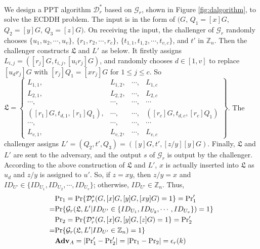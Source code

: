 We design a PPT algorithm $\mathcal{D}^*_r$ based on $\mathcal{G}_r$, shown in Figure \ref{fig:dalgorithm}, to solve the ECDDH problem.
The input is in the form of $(G$, $Q_1=[x]G$, $Q_2=[y]G$, $Q_3=[z]G)$.
On receiving the input, the challenger of $\mathcal{G}_r$ randomly chooses
 $\{u_1, u_2, \cdots, u_v\}$, $\{r_1, r_2, \cdots, r_c\}$, $\{t_{1, 1}, t_{1, 2}, \cdots, t_{v, c}\}$, and $t'$ in $\mathbb{Z}_n$.
Then the challenger constructs $\mathfrak{L}$ and $L'$ as below.
It firstly assigns $L_{i, j} = ([r_j]G, t_{i, j}, [u_ir_j]G)$, %
    and randomly chooses $d \in [1, v]$ to
 replace $[u_d r_j]G$ with $[r_j]Q_1=[xr_j]G$ for $1\leq j \leq c$.
So $\mathfrak{L}=\left \{ \begin{matrix}
L_{1,1},&L_{1,2},&\cdots,&L_{1,c}\\
L_{2,1},& L_{2,2},&\cdots,&L_{2,c}\\
\cdots,&\cdots,&\cdots,&\cdots\\
([r_{1}]G, t_{d, 1}, [r_{1}]Q_1),&\cdots,&\cdots,&([r_{c}]G, t_{d, c}, [r_{c}]Q_1)\\
\cdots,&\cdots,&\cdots,&\cdots\\
L_{v,1},&L_{v,2},&\cdots,&L_{v,c}
\end{matrix}\right\}$.
%
The challenger assigns $L' = (Q_2, t', Q_3) = ([y]G, t', [z/y][y]G)$.
Finally,
    $\mathfrak{L}$ and $L'$ are sent to the adversary,
        and the output $s$ of $\mathcal{G}_r$ is output by the challenger.
According to the above construction of $\mathfrak{L}$ and $L'$,
    $x$ is actually inserted into $\mathfrak{L}$ as $u_d$
    and $z/y$ is assigned to $u'$.
So, if $z = xy$, then $z/y=x$ and $ID_{U'} \in \{ID_{U_1}, ID_{U_2}, \cdots, ID_{U_v}\}$;
    otherwise, $ID_{U'} \in \mathbb{Z}_n$.
Thus,
\begin{align*}
&{\rm Pr}_1={\rm Pr}\{\mathcal{D}^*_r(G, [x]G, [y]G, [xy]G)=1\}={\rm Pr}'_1 \\=&  {\rm Pr}\{\mathcal{G}_r(\mathfrak{L}, L'|ID_{U'} \in \{ID_{U_1}, ID_{U_2}, \cdots, ID_{U_v}\})=1\} \\
&{\rm Pr}_2={\rm Pr}\{\mathcal{D}^*_r(G, [x]G, [y]G, [z]G)=1\} ={\rm Pr}'_2 \\=&  {\rm Pr}\{\mathcal{G}_r(\mathfrak{L}, L'|ID_{U'} \in \mathbb{Z}_n)=1\}\\
&{\mathbf{Adv}}_{A}=|{\rm Pr}'_1-{\rm Pr}'_2|=|{\rm Pr}_1-{\rm Pr}_2|=\epsilon_{r}(k)
\end{align*}

